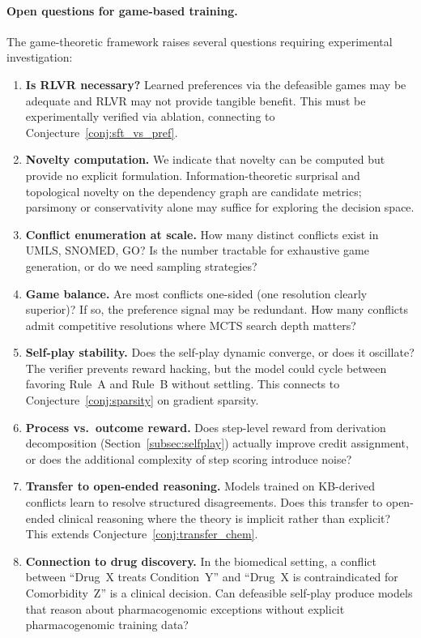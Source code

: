 \documentclass{article}
\theoremstyle{definition}
\begin{document}
\paragraph{Open questions for game-based training.} The game-theoretic framework raises several questions requiring experimental investigation:

\begin{enumerate}[nosep]
    \item \textbf{Is RLVR necessary?} Learned preferences via the defeasible games may be adequate and RLVR may not provide tangible benefit. This must be experimentally verified via ablation, connecting to Conjecture~\ref{conj:sft_vs_pref}.
    \item \textbf{Novelty computation.} We indicate that novelty can be computed but provide no explicit formulation. Information-theoretic surprisal and topological novelty on the dependency graph are candidate metrics; parsimony or conservativity alone may suffice for exploring the decision space.
    \item \textbf{Conflict enumeration at scale.} How many distinct conflicts exist in UMLS, SNOMED, GO? Is the number tractable for exhaustive game generation, or do we need sampling strategies?
    \item \textbf{Game balance.} Are most conflicts one-sided (one resolution clearly superior)? If so, the preference signal may be redundant. How many conflicts admit competitive resolutions where MCTS search depth matters?
    \item \textbf{Self-play stability.} Does the self-play dynamic converge, or does it oscillate? The verifier prevents reward hacking, but the model could cycle between favoring Rule~A and Rule~B without settling. This connects to Conjecture~\ref{conj:sparsity} on gradient sparsity.
    \item \textbf{Process vs.\ outcome reward.} Does step-level reward from derivation decomposition (Section~\ref{subsec:selfplay}) actually improve credit assignment, or does the additional complexity of step scoring introduce noise?
    \item \textbf{Transfer to open-ended reasoning.} Models trained on KB-derived conflicts learn to resolve structured disagreements. Does this transfer to open-ended clinical reasoning where the theory is implicit rather than explicit? This extends Conjecture~\ref{conj:transfer_chem}.
    \item \textbf{Connection to drug discovery.} In the biomedical setting, a conflict between ``Drug~X treats Condition~Y'' and ``Drug~X is contraindicated for Comorbidity~Z'' is a clinical decision. Can defeasible self-play produce models that reason about pharmacogenomic exceptions without explicit pharmacogenomic training data?

\end{enumerate}
\end{document}
